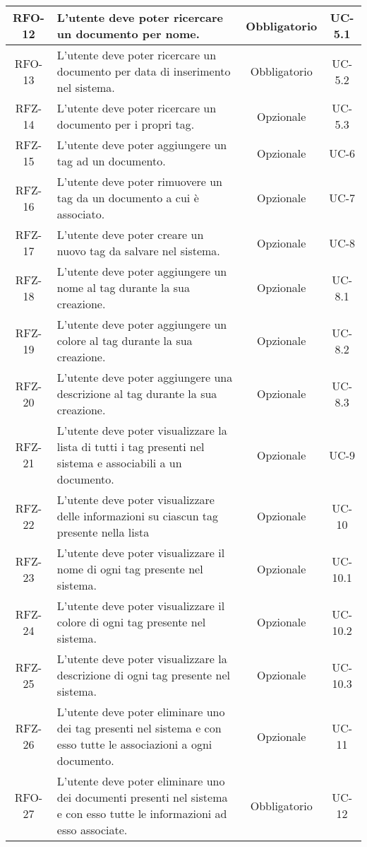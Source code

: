 \begin{xltabular}{\textwidth}{| c | X | c | c |}
    RFO-12 & L’utente deve poter ricercare un documento per nome. & Obbligatorio & UC-5.1 \\
    \hline
    RFO-13 & L’utente deve poter ricercare un documento per data di inserimento nel sistema. & Obbligatorio & UC-5.2 \\
    \hline
    RFZ-14 & L’utente deve poter ricercare un documento per i propri tag. & Opzionale & UC-5.3 \\
    \hline
    RFZ-15 & L’utente deve poter aggiungere un tag ad un documento. & Opzionale & UC-6 \\
    \hline
    RFZ-16 & L’utente deve poter rimuovere un tag da un documento a cui è associato. & Opzionale & UC-7 \\
    \hline
    RFZ-17 & L’utente deve poter creare un nuovo tag da salvare nel sistema. & Opzionale & UC-8 \\
    \hline
    RFZ-18 & L’utente deve poter aggiungere un nome al tag durante la sua creazione. & Opzionale & UC-8.1 \\
    \hline
    RFZ-19 & L’utente deve poter aggiungere un colore al tag durante la sua creazione. & Opzionale & UC-8.2 \\
    \hline
    RFZ-20 & L’utente deve poter aggiungere una descrizione al tag durante la sua creazione. & Opzionale & UC-8.3 \\
    \hline
    RFZ-21 & L’utente deve poter visualizzare la lista di tutti i tag presenti nel sistema e associabili a un documento. & Opzionale & UC-9 \\
    \hline
    RFZ-22 & L’utente deve poter visualizzare delle informazioni su ciascun tag presente nella lista & Opzionale & UC-10 \\
    \hline
    RFZ-23 & L’utente deve poter visualizzare il nome di ogni tag presente nel sistema. & Opzionale & UC-10.1 \\
    \hline
    RFZ-24 & L’utente deve poter visualizzare il colore di ogni tag presente nel sistema. & Opzionale & UC-10.2 \\
    \hline
    RFZ-25 & L’utente deve poter visualizzare la descrizione di ogni tag presente nel sistema. & Opzionale & UC-10.3 \\
    \hline
    RFZ-26 & L’utente deve poter eliminare uno dei tag presenti nel sistema e con esso tutte le associazioni a ogni documento. & Opzionale & UC-11 \\
    \hline
    RFO-27 & L’utente deve poter eliminare uno dei documenti presenti nel sistema e con esso tutte le informazioni ad esso associate. & Obbligatorio & UC-12 \\

\end{xltabular}
